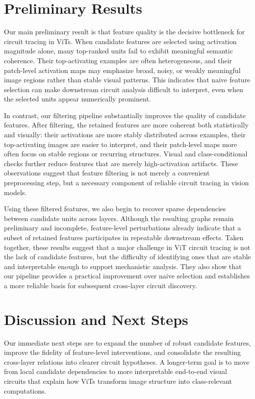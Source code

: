 \documentclass[10pt]{article}
\begin{document}
\section{Preliminary Results}

Our main preliminary result is that feature quality is the decisive bottleneck for circuit tracing in ViTs. When candidate features are selected using activation magnitude alone, many top-ranked units fail to exhibit meaningful semantic coherence. Their top-activating examples are often heterogeneous, and their patch-level activation maps may emphasize broad, noisy, or weakly meaningful image regions rather than stable visual patterns. This indicates that naive feature selection can make downstream circuit analysis difficult to interpret, even when the selected units appear numerically prominent.

In contrast, our filtering pipeline substantially improves the quality of candidate features. After filtering, the retained features are more coherent both statistically and visually: their activations are more stably distributed across examples, their top-activating images are easier to interpret, and their patch-level maps more often focus on stable regions or recurring structures. Visual and class-conditional checks further reduce features that are merely high-activation artifacts. These observations suggest that feature filtering is not merely a convenient preprocessing step, but a necessary component of reliable circuit tracing in vision models.

Using these filtered features, we also begin to recover sparse dependencies between candidate units across layers. Although the resulting graphs remain preliminary and incomplete, feature-level perturbations already indicate that a subset of retained features participates in repeatable downstream effects. Taken together, these results suggest that a major challenge in ViT circuit tracing is not the lack of candidate features, but the difficulty of identifying ones that are stable and interpretable enough to support mechanistic analysis. They also show that our pipeline provides a practical improvement over naive selection and establishes a more reliable basis for subsequent cross-layer circuit discovery.

\section{Discussion and Next Steps}

Our immediate next steps are to expand the number of robust candidate features, improve the fidelity of feature-level interventions, and consolidate the resulting cross-layer relations into clearer circuit hypotheses. A longer-term goal is to move from local candidate dependencies to more interpretable end-to-end visual circuits that explain how ViTs transform image structure into class-relevant computations.
\end{document}
